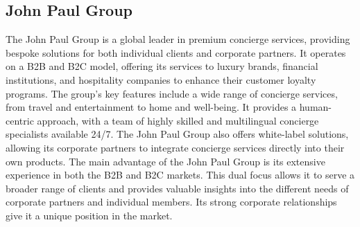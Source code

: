 \subsection{John Paul Group}
The John Paul Group \cite{johnpaul2025programmes} is a global leader in premium concierge services, providing bespoke solutions for both individual clients and corporate partners. It operates on a B2B and B2C model, offering its services to luxury brands, financial institutions, and hospitality companies to enhance their customer loyalty programs.
The group's key features include a wide range of concierge services, from travel and entertainment to home and well-being. It provides a human-centric approach, with a team of highly skilled and multilingual concierge specialists available 24/7. The John Paul Group also offers white-label solutions, allowing its corporate partners to integrate concierge services directly into their own products.
The main advantage of the John Paul Group is its extensive experience in both the B2B and B2C markets. This dual focus allows it to serve a broader range of clients and provides valuable insights into the different needs of corporate partners and individual members. Its strong corporate relationships give it a unique position in the market.

